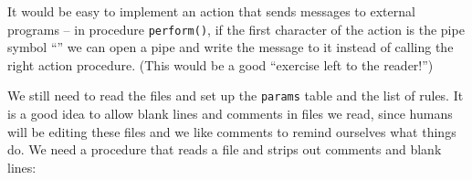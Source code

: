 
It would be easy to implement an action that sends messages to external
programs -- in procedure \texttt{perform()}, if the first character of
the action is the pipe symbol
{\textquotedblleft}{\textbar}{\textquotedblright} we can open a pipe
and write the message to it instead of calling the right action
procedure. (This would be a good {\textquotedblleft}exercise left to
the reader!{\textquotedblright})

We still need to read the files and set up the \texttt{params} table and
the list of rules. It is a good idea to allow blank lines and comments
in files we read, since humans will be editing these files and we like
comments to remind ourselves what things do. We need a procedure that
reads a file and strips out comments and blank lines:

